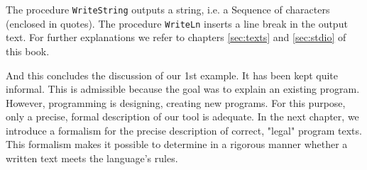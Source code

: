 The procedure \verb|WriteString| outputs a string, i.e. a Sequence of characters (enclosed in quotes).
The procedure \verb|WriteLn| inserts a line break in the output text. For further explanations we
refer to chapters \ref{sec:texts} and \ref{sec:stdio} of this book.

And this concludes the discussion of our 1st example. It has been kept quite informal. This is
admissible because the goal was to explain an existing program. However, programming is designing,
creating new programs. For this purpose, only a precise, formal description of our tool is
adequate. In the next chapter, we introduce a formalism for the precise description of correct,
"legal" program texts. This formalism makes it possible to determine in a rigorous manner
whether a written text meets the language's rules.
